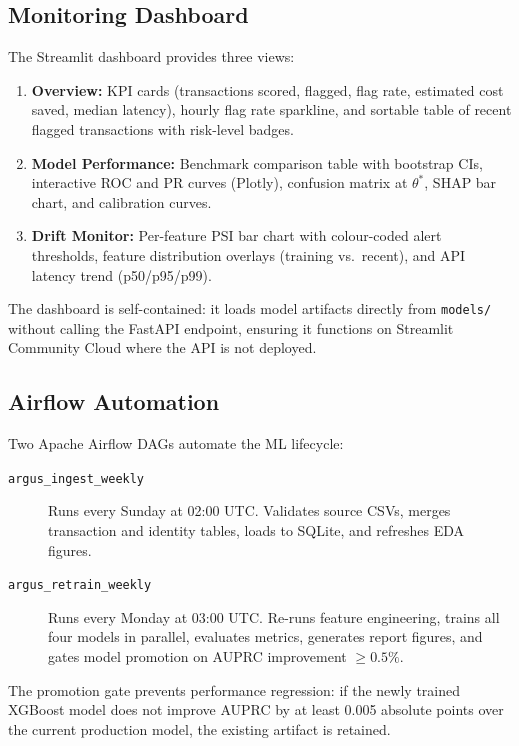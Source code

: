 \subsection{Monitoring Dashboard}

The Streamlit dashboard provides three views:
\begin{enumerate}
    \item \textbf{Overview:} KPI cards (transactions scored, flagged, flag rate,
          estimated cost saved, median latency), hourly flag rate sparkline,
          and sortable table of recent flagged transactions with risk-level badges.
    \item \textbf{Model Performance:} Benchmark comparison table with
          bootstrap CIs, interactive ROC and PR curves (Plotly), confusion
          matrix at $\theta^*$, SHAP bar chart, and calibration curves.
    \item \textbf{Drift Monitor:} Per-feature PSI bar chart with colour-coded
          alert thresholds, feature distribution overlays (training vs.\ recent),
          and API latency trend (p50/p95/p99).
\end{enumerate}

The dashboard is self-contained: it loads model artifacts directly from
\texttt{models/} without calling the FastAPI endpoint, ensuring it functions
on Streamlit Community Cloud where the API is not deployed.

\subsection{Airflow Automation}

Two Apache Airflow DAGs automate the ML lifecycle:
\begin{description}
    \item[\texttt{argus\_ingest\_weekly}] Runs every Sunday at 02:00 UTC.
         Validates source CSVs, merges transaction and identity tables,
         loads to SQLite, and refreshes EDA figures.
    \item[\texttt{argus\_retrain\_weekly}] Runs every Monday at 03:00 UTC.
         Re-runs feature engineering, trains all four models in parallel,
         evaluates metrics, generates report figures, and gates model
         promotion on AUPRC improvement $\geq 0.5\%$.
\end{description}

The promotion gate prevents performance regression: if the newly trained
XGBoost model does not improve AUPRC by at least 0.005 absolute points
over the current production model, the existing artifact is retained.


